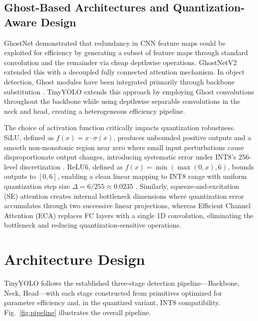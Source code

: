 \documentclass[conference]{IEEEtran}
\begin{document}
\subsection{Ghost-Based Architectures and Quantization-Aware Design}
GhostNet \cite{han2020ghostnet} demonstrated that redundancy in CNN feature maps could be exploited for efficiency by generating a subset of feature maps through standard convolution and the remainder via cheap depthwise operations. GhostNetV2 \cite{tang2022ghostnetv2} extended this with a decoupled fully connected attention mechanism. In object detection, Ghost modules have been integrated primarily through backbone substitution \cite{chen2023ghostdet, wang2022lightweight}. TinyYOLO extends this approach by employing Ghost convolutions throughout the backbone while using depthwise separable convolutions in the neck and head, creating a heterogeneous efficiency pipeline.

The choice of activation function critically impacts quantization robustness. SiLU, defined as $f(x) = x \cdot \sigma(x)$, produces unbounded positive outputs and a smooth non-monotonic region near zero where small input perturbations cause disproportionate output changes, introducing systematic error under INT8's 256-level discretization \cite{nagel2021white, banner2019post}. ReLU6, defined as $f(x) = \min(\max(0, x), 6)$, bounds outputs to $[0, 6]$, enabling a clean linear mapping to INT8 range with uniform quantization step size $\Delta = 6/255 \approx 0.0235$ \cite{sandler2018mobilenetv2}. Similarly, squeeze-and-excitation (SE) attention \cite{hu2018squeeze} creates internal bottleneck dimensions where quantization error accumulates through two successive linear projections, whereas Efficient Channel Attention (ECA) \cite{wang2020eca} replaces FC layers with a single 1D convolution, eliminating the bottleneck and reducing quantization-sensitive operations.

\section{Architecture Design}
TinyYOLO follows the established three-stage detection pipeline---Backbone, Neck, Head---with each stage constructed from primitives optimized for parameter efficiency and, in the quantized variant, INT8 compatibility. Fig.~\ref{fig:pipeline} illustrates the overall pipeline.
\end{document}
